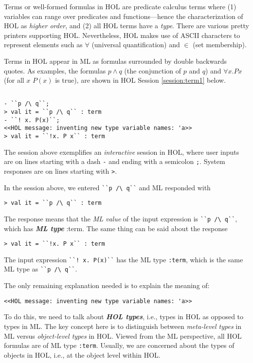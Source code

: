 Terms or well-formed formulas in HOL are predicate calculus terms
where (1) variables can range over predicates and functions---hence
the characterization of HOL as \emph{higher order}, and (2) all HOL
terms have a \emph{type}. There are various pretty printers supporting
HOL. Nevertheless, HOL makes use of ASCII characters to represent
elements such as $\forall$ (universal quantification) and $\in$ (set
membership).

Terms in HOL appear in ML as formulas surrounded by double backwards
quotes.  As examples, the formulas $p \wedge q$ (the conjunction of
$p$ and $q$) and $\forall x.P x$ (for all $x$ $P(x)$ is true), are
shown in HOL Session \ref{session:term1} below.
\begin{session}
\label{session:term1}
\begin{verbatim}

- ``p /\ q``;
> val it = ``p /\ q`` : term
- ``! x. P(x)``;
<<HOL message: inventing new type variable names: 'a>>
> val it = ``!x. P x`` : term
\end{verbatim}
\end{session}
The session above exemplifies an \emph{interactive} session in HOL,
where user inputs are on lines starting with a dash \texttt{-} and
ending with a semicolon \texttt{;}. System responses are on lines
starting with \texttt{>}.

In the session above, we entered \small{\verb|``p /\ q``|} and ML
responded with
\begin{verbatim}
> val it = ``p /\ q`` : term
\end{verbatim}
The response means that the \emph{ML value} of the input expression is
\small{\verb|``p /\ q``|}, which has \emph{\textbf{ML
  type}} \textrm{:term}. The same thing can be said about the response
\begin{verbatim}
> val it = ``!x. P x`` : term
\end{verbatim}
The input expression \small{\verb|``! x. P(x)``|} has the
ML type \texttt{:term}, which is the same ML type as
\small{\verb|``p /\ q``|}.

The only remaining explanation needed is to explain the meaning of:
\begin{verbatim}
<<HOL message: inventing new type variable names: 'a>>
\end{verbatim}
To do this, we need to talk about \emph{\textbf{HOL types}}, i.e.,
types in HOL as opposed to types in ML. The key concept here is to
distinguish between \emph{meta-level types} in ML versus
\emph{object-level types} in HOL. Viewed from the ML perspective, all
HOL formulas are of ML type \texttt{:term}.  Usually, we are concerned
about the types of objects in HOL, i.e., at the object level within
HOL.

